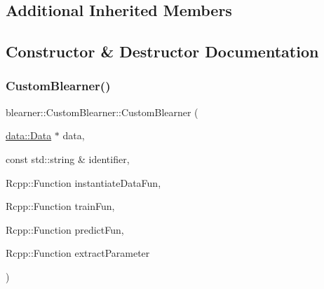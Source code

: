 \subsection*{Additional Inherited Members}


\subsection{Constructor \& Destructor Documentation}
\mbox{\label{classblearner_1_1_custom_blearner_a99b05f69e8d3cacfab556b6a5310f50a}} 
\subsubsection{\texorpdfstring{Custom\+Blearner()}{CustomBlearner()}}
{\footnotesize\ttfamily blearner\+::\+Custom\+Blearner\+::\+Custom\+Blearner (\begin{DoxyParamCaption}\item[{\hyperlink{classdata_1_1_data}{data\+::\+Data} $\ast$}]{data,  }\item[{const std\+::string \&}]{identifier,  }\item[{Rcpp\+::\+Function}]{instantiate\+Data\+Fun,  }\item[{Rcpp\+::\+Function}]{train\+Fun,  }\item[{Rcpp\+::\+Function}]{predict\+Fun,  }\item[{Rcpp\+::\+Function}]{extract\+Parameter }\end{DoxyParamCaption})}

